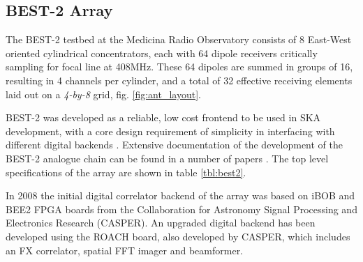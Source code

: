 \documentclass[useAMS,macros,usenatbib,onecolumn]{mn2e}
\begin{document}
\subsection{BEST-2 Array}
\label{best-2 array}

The BEST-2 testbed at the Medicina Radio Observatory consists of 8 East-West oriented cylindrical concentrators, each with 64 dipole receivers critically sampling for focal line at 408MHz.
These 64 dipoles are summed in groups of 16, resulting in 4 channels per cylinder, and a total of 32 effective receiving elements laid out on a \emph{4-by-8} grid, fig. \ref{fig:ant_layout}.

BEST-2 was developed as a reliable, low cost frontend to be used in SKA development, with a core design requirement of simplicity in interfacing with different digital backends \citep{best2}.
Extensive documentation of the development of the BEST-2 analogue chain can be found in a number of papers \citep{best2-lna} \citep{best2-rec}. The top level specifications of the array are shown in table \ref{tbl:best2}.


In 2008 the initial digital correlator backend of the array was based on iBOB and BEE2 FPGA boards from the Collaboration for Astronomy Signal Processing and Electronics Research (CASPER)\citep{best2-casper}.
An upgraded digital backend has been developed using the ROACH board, also developed by CASPER, which includes an FX correlator, spatial FFT imager and beamformer.
\end{document}
